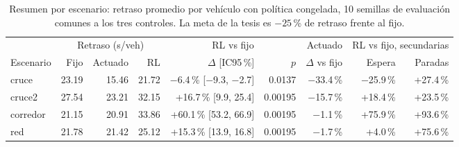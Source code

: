 \begin{table}[H]
\centering
\scriptsize
\setlength{\tabcolsep}{3pt}
\begin{tabular}{lrrrrrrrr}
\toprule
 & \multicolumn{3}{c}{Retraso (s/veh)} & \multicolumn{2}{c}{RL vs fijo} & Actuado & \multicolumn{2}{c}{RL vs fijo, secundarias} \\
\cmidrule(lr){2-4}\cmidrule(lr){5-6}\cmidrule(lr){7-7}\cmidrule(lr){8-9}
Escenario & Fijo & Actuado & RL & $\Delta$ [IC95\,\%] & $p$ & $\Delta$ vs fijo & Espera & Paradas \\
\midrule
cruce & 23.19 & 15.46 & 21.72 & $-$6.4\,\% [$-$9.3, $-$2.7] & 0.0137 & $-$33.4\,\% & $-$25.9\,\% & +27.4\,\% \\
cruce2 & 27.54 & 23.21 & 32.15 & +16.7\,\% [9.9, 25.4] & 0.00195 & $-$15.7\,\% & +18.4\,\% & +23.5\,\% \\
corredor & 21.15 & 20.91 & 33.86 & +60.1\,\% [53.2, 66.9] & 0.00195 & $-$1.1\,\% & +75.9\,\% & +93.6\,\% \\
red & 21.78 & 21.42 & 25.12 & +15.3\,\% [13.9, 16.8] & 0.00195 & $-$1.7\,\% & +4.0\,\% & +75.6\,\% \\
\bottomrule
\end{tabular}
\caption[Resumen por escenario]{Resumen por escenario: retraso promedio por vehículo con política congelada, 10 semillas de evaluación comunes a los tres controles. La meta de la tesis es $-25$\,\% de retraso frente al fijo.}
\label{tab:resumen-escenarios}
\end{table}
